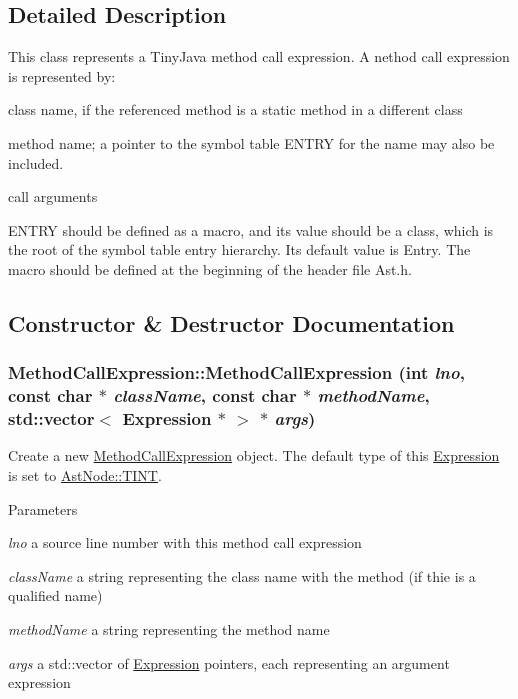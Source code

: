 \subsection{Detailed Description}
This class represents a TinyJava method call expression. A nethod call expression is represented by:
\begin{DoxyItemize}
\item class name, if the referenced method is a static method in a different class
\item method name; a pointer to the symbol table ENTRY for the name may also be included.
\item call arguments
\end{DoxyItemize}

ENTRY should be defined as a macro, and its value should be a class, which is the root of the symbol table entry hierarchy. Its default value is Entry. The macro should be defined at the beginning of the header file Ast.h. 

\subsection{Constructor \& Destructor Documentation}
\hypertarget{classMethodCallExpression_a5019b48097b4bcddd2016e19e7aa9b21}{
\subsubsection[{MethodCallExpression}]{\setlength{\rightskip}{0pt plus 5cm}MethodCallExpression::MethodCallExpression (int {\em lno}, \/  const char $\ast$ {\em className}, \/  const char $\ast$ {\em methodName}, \/  std::vector$<$ {\bf Expression} $\ast$ $>$ $\ast$ {\em args})}}
\label{classMethodCallExpression_a5019b48097b4bcddd2016e19e7aa9b21}
Create a new \hyperlink{classMethodCallExpression}{MethodCallExpression} object. The default type of this \hyperlink{classExpression}{Expression} is set to \hyperlink{classAstNode_a8568313f5d280773a446280c94d382f8}{AstNode::TINT}.


\begin{DoxyParams}{Parameters}
\item[{\em lno}]a source line number with this method call expression \item[{\em className}]a string representing the class name with the method (if thie is a qualified name) \item[{\em methodName}]a string representing the method name \item[{\em args}]a std::vector of \hyperlink{classExpression}{Expression} pointers, each representing an argument expression \end{DoxyParams}

